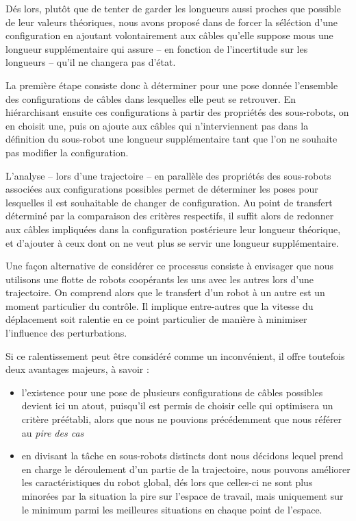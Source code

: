 D\'es lors, plut\^ot que de tenter de garder les longueurs aussi proches 
que possible de leur valeurs th\'eoriques, nous avons propos\'e 
dans \cite{ramadour2014} de forcer la s\'el\'ection d'une configuration en 
ajoutant volontairement aux c\^ables qu'elle suppose mous une longueur 
suppl\'ementaire qui assure -- en fonction de l'incertitude sur les longueurs 
-- qu'il ne changera pas d'\'etat.

La premi\`ere \'etape consiste donc \`a d\'eterminer pour une pose donn\'ee 
l'ensemble des configurations de c\^ables dans lesquelles elle peut se 
retrouver. En hi\'erarchisant ensuite ces configurations \`a partir des 
propri\'et\'es des sous-robots, on en choisit une, puis on ajoute aux 
c\^ables qui n'interviennent pas dans la d\'efinition du sous-robot une 
longueur suppl\'ementaire tant que l'on ne souhaite pas modifier la 
configuration.

L'analyse -- lors d'une trajectoire -- en parall\`ele des propri\'et\'es des 
sous-robots associ\'ees aux configurations possibles permet de d\'eterminer les 
poses pour lesquelles il est souhaitable de changer de configuration. Au point 
de transfert d\'etermin\'e par la comparaison des crit\`eres respectifs, il 
suffit alors de redonner aux c\^ables impliqu\'ees dans la configuration 
post\'erieure leur longueur th\'eorique, et d'ajouter \`a ceux dont on ne veut 
plus se servir une longueur suppl\'ementaire.

Une fa\c con alternative de consid\'erer ce processus consiste \`a envisager 
que nous utilisons une flotte de robots coop\'erants les uns avec les autres 
lors d'une trajectoire. On comprend alors que le transfert d'un robot \`a un 
autre est un moment particulier du contr\^ole. Il implique entre-autres que la 
vitesse du d\'eplacement soit ralentie en ce point particulier de mani\`ere \`a 
minimiser l'influence des perturbations.

Si ce ralentissement peut \^etre consid\'er\'e comme un inconv\'enient, 
il offre toutefois deux avantages majeurs, \`a savoir :
\begin{itemize}
 \item l'existence pour une pose de plusieurs configurations de c\^ables 
possibles devient ici un atout, puisqu'il est permis de choisir celle qui 
optimisera un crit\`ere pr\'e\'etabli, alors que nous ne pouvions 
pr\'ec\'edemment que nous r\'ef\'erer au {\it pire des cas}
  \item en divisant la t\^ache en sous-robots distincts dont nous d\'ecidons 
lequel prend en charge le d\'eroulement d'un partie de la trajectoire, nous 
pouvons am\'eliorer les caract\'eristiques du robot global, d\'es lors que 
celles-ci ne sont plus minor\'ees par la situation la pire sur l'espace de 
travail, mais uniquement sur le minimum parmi les meilleures situations en 
chaque point de l'espace.
\end{itemize}

